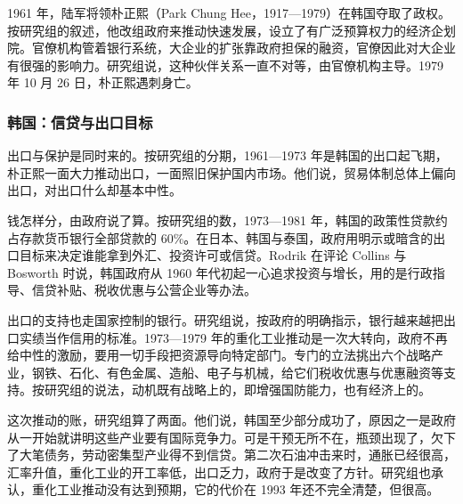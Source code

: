 1961 年，陆军将领朴正熙（Park Chung Hee，1917—1979）在韩国夺取了政权\cite{worldbank1993,loc42}。按研究组的叙述，他改组政府来推动快速发展，设立了有广泛预算权力的经济企划院\cite{worldbank1993}。官僚机构管着银行系统，大企业的扩张靠政府担保的融资，官僚因此对大企业有很强的影响力\cite{worldbank1993}。研究组说，这种伙伴关系一直不对等，由官僚机构主导\cite{worldbank1993}。1979 年 10 月 26 日，朴正熙遇刺身亡\cite{loc42}。

\subsubsection{韩国：信贷与出口目标}

出口与保护是同时来的。按研究组的分期，1961—1973 年是韩国的出口起飞期，朴正熙一面大力推动出口，一面照旧保护国内市场\cite{worldbank1993}。他们说，贸易体制总体上偏向出口，对出口什么却基本中性\cite{worldbank1993}。

钱怎样分，由政府说了算。按研究组的数，1973—1981 年，韩国的政策性贷款约占存款货币银行全部贷款的 60\%\cite{worldbank1993}。在日本、韩国与泰国，政府用明示或暗含的出口目标来决定谁能拿到外汇、投资许可或信贷\cite{worldbank1993}。Rodrik 在评论 Collins 与 Bosworth 时说，韩国政府从 1960 年代初起一心追求投资与增长，用的是行政指导、信贷补贴、税收优惠与公营企业等办法\cite{collinsbosworth1996}。

出口的支持也走国家控制的银行。研究组说，按政府的明确指示，银行越来越把出口实绩当作信用的标准\cite{worldbank1993}。1973—1979 年的重化工业推动是一次大转向，政府不再给中性的激励，要用一切手段把资源导向特定部门\cite{worldbank1993}。专门的立法挑出六个战略产业，钢铁、石化、有色金属、造船、电子与机械，给它们税收优惠与优惠融资等支持\cite{worldbank1993}。按研究组的说法，动机既有战略上的，即增强国防能力，也有经济上的\cite{worldbank1993}。

这次推动的账，研究组算了两面。他们说，韩国至少部分成功了，原因之一是政府从一开始就讲明这些产业要有国际竞争力\cite{worldbank1993}。可是干预无所不在，瓶颈出现了，欠下了大笔债务，劳动密集型产业得不到信贷\cite{worldbank1993}。第二次石油冲击来时，通胀已经很高，汇率升值，重化工业的开工率低，出口乏力，政府于是改变了方针\cite{worldbank1993}。研究组也承认，重化工业推动没有达到预期，它的代价在 1993 年还不完全清楚，但很高\cite{worldbank1993}。

